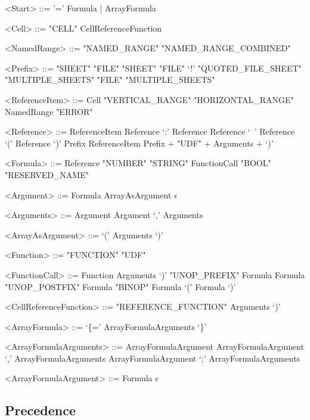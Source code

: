 \documentclass[conference]{IEEEtran}
\begin{document}
\begin{grammar}
<Start> ::= '=' Formula | ArrayFormula


%
%
%
%

<Cell> ::= "CELL"
	  \alt CellReferenceFunction


<NamedRange> ::= "NAMED_RANGE"
            \alt "NAMED_RANGE_COMBINED"

<Prefix> ::= "SHEET"
	\alt "FILE" "SHEET"
	\alt "FILE" `!'
	\alt "QUOTED_FILE_SHEET"
	\alt "MULTIPLE_SHEETS"
	\alt "FILE" "MULTIPLE_SHEETS"

<ReferenceItem> ::= Cell
	\alt "VERTICAL_RANGE"
	\alt "HORIZONTAL_RANGE"
	\alt NamedRange
	\alt "ERROR" 

<Reference> ::= ReferenceItem
	\alt Reference `:' Reference
	\alt Reference `\ ' Reference
	\alt `(' Reference `)'
	\alt Prefix ReferenceItem
              \alt Prefix + "UDF" + Arguments + `)'
              
<Formula> ::= Reference
         \alt "NUMBER"
         \alt "STRING"
         \alt FunctionCall
         \alt "BOOL"
         \alt "RESERVED_NAME"

<Argument> ::= Formula
\alt ArrayAsArgument
\alt $\epsilon$

<Arguments> ::= Argument
\alt Argument `,' Arguments

<ArrayAsArgument> ::= `(' Arguments `)'

<Function> ::= "FUNCTION"
	\alt "UDF"

<FunctionCall> ::= Function Arguments `)'
\alt "UNOP_PREFIX" Formula
\alt Formula "UNOP_POSTFIX"
\alt Formula "BINOP" Formula
\alt `(' Formula `)'

<CellReferenceFunction> ::= "REFERENCE_FUNCTION" Arguments `)'

<ArrayFormula> ::= `\{=' ArrayFormulaArguments `\}'

<ArrayFormulaArguments> ::= ArrayFormulaArgument
 \alt ArrayFormulaArgument `,' ArrayFormulaArguments
 \alt ArrayFormulaArgument `;' ArrayFormulaArguments
 
<ArrayFormulaArgument> ::= Formula
 \alt $\epsilon$


\end{grammar}

\subsection{Precedence}
\end{document}
